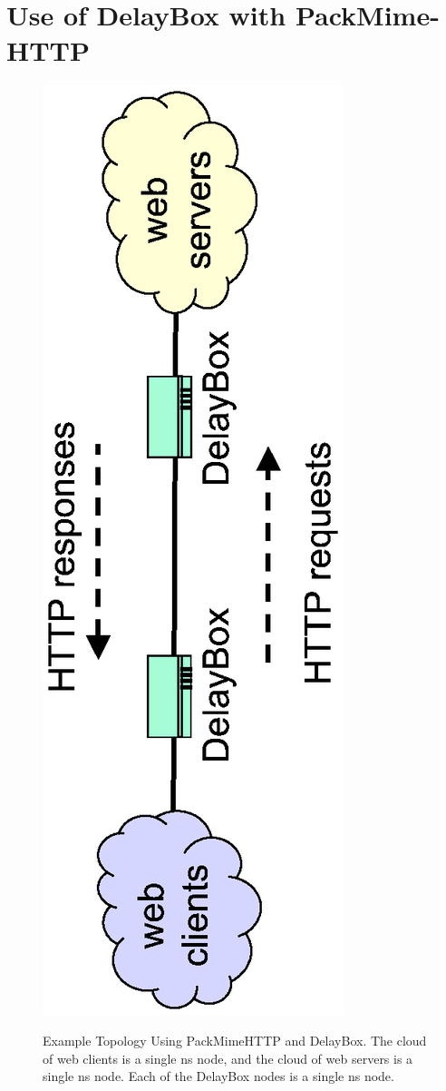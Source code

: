 \section{Use of DelayBox with PackMime-HTTP}
\label{sec:pm-db}

\begin{figure}
\centering
\includegraphics[scale=0.75, angle=270]{figures/packmime-delaybox.eps}
\label{fig-pmdb}
\caption{Example Topology Using PackMimeHTTP and DelayBox. The cloud
  of web clients is a single ns node, and the cloud of web servers is
  a single ns node. Each of the DelayBox nodes is a single ns node.} 
\end{figure}  

